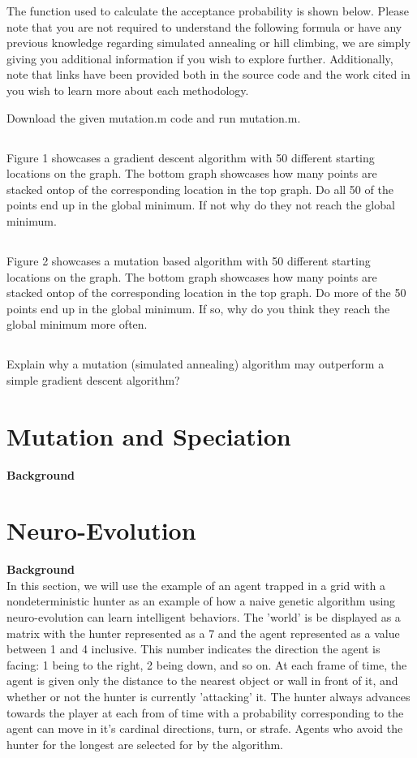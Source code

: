\documentclass[12]{extarticle}
\begin{document}
The function used to calculate the acceptance probability is shown below\cite{Gnanachandran}. Please note that you are not required to understand the following formula or have any previous knowledge regarding simulated annealing or hill climbing, we are simply giving you additional information if you wish to explore further. Additionally, note that links have been provided both in the source code and the work cited in you wish to learn more about each methodology.



Download the given mutation.m code and run mutation.m.
\subsection{}
Figure 1 showcases a gradient descent algorithm with 50 different starting locations on the graph. The bottom graph showcases how many points are stacked ontop of the corresponding location in the top graph. Do all 50 of the points end up in the global minimum. If not why do they not reach the global minimum.
\subsection{}
Figure 2 showcases a mutation based algorithm with 50 different starting locations on the graph. The bottom graph showcases how many points are stacked ontop of the corresponding location in the top graph. Do more of the 50 points end up in the global minimum. If so, why do you think they reach the global minimum more often.
\subsection{}
Explain why a mutation (simulated annealing) algorithm may outperform a simple gradient descent algorithm?
\section{Mutation and Speciation}
\textbf{Background} \\


\section{Neuro-Evolution}
\textbf{Background} \\
In this section, we will use the example of an agent trapped in a grid with a nondeterministic hunter as an example of how a naive genetic algorithm using neuro-evolution can learn intelligent behaviors. The 'world' is be displayed as a matrix with the hunter represented as a 7 and the agent represented as a value between 1 and 4 inclusive. This number indicates the direction the agent is facing: 1 being to the right, 2 being down, and so on. At each frame of time, the agent is given only the distance to the nearest object or wall in front of it, and whether or not the hunter is currently 'attacking' it. The hunter always advances towards the player at each from of time with a probability corresponding to the agent can move in it's cardinal directions, turn, or strafe. Agents who avoid the hunter for the longest are selected for by the algorithm. 
\end{document}
